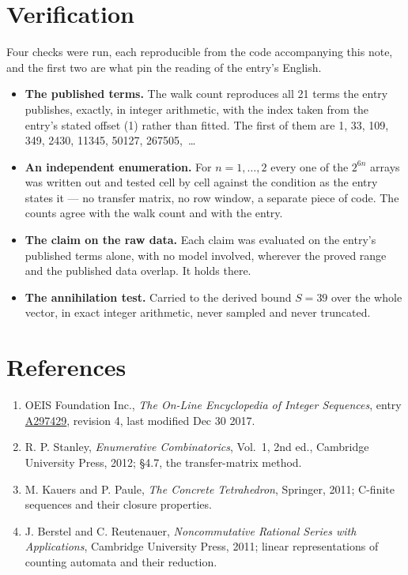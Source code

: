 \documentclass[11pt]{article}
\theoremstyle{definition}
\begin{document}
\section{Verification}

Four checks were run, each reproducible from the code accompanying this note, and the first two are what pin the reading of the entry's English.

\begin{itemize}

\item {\bfseries The published terms.} The walk count reproduces all 21 terms the entry publishes, exactly, in integer arithmetic, with the index taken from the entry's stated offset (1) rather than fitted. The first of them are 1, 33, 109, 349, 2430, 11345, 50127, 267505,~\dots

\item {\bfseries An independent enumeration.} For $n = 1,\dots,2$ every one of the $2^{6n}$ arrays was written out and tested cell by cell against the condition as the entry states it --- no transfer matrix, no row window, a separate piece of code. The counts agree with the walk count and with the entry.

\item {\bfseries The claim on the raw data.} Each claim was evaluated on the entry's published terms alone, with no model involved, wherever the proved range and the published data overlap. It holds there.

\item {\bfseries The annihilation test.} Carried to the derived bound $S = 39$ over the whole vector, in exact integer arithmetic, never sampled and never truncated.

\end{itemize}

\section{References}

\begin{enumerate}

\item OEIS Foundation Inc., \emph{The On-Line Encyclopedia of Integer Sequences}, entry \href{https://oeis.org/A297429}{A297429}, revision 4, last modified Dec 30 2017.

\item R. P. Stanley, \emph{Enumerative Combinatorics}, Vol.~1, 2nd ed., Cambridge University Press, 2012; \S4.7, the transfer-matrix method.

\item M. Kauers and P. Paule, \emph{The Concrete Tetrahedron}, Springer, 2011; C-finite sequences and their closure properties.

\item J. Berstel and C. Reutenauer, \emph{Noncommutative Rational Series with Applications}, Cambridge University Press, 2011; linear representations of counting automata and their reduction.

\end{enumerate}
\end{document}
